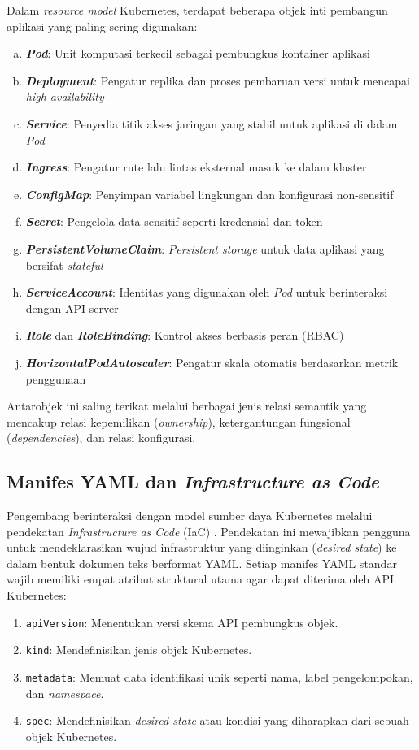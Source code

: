 Dalam \textit{resource model} Kubernetes, terdapat beberapa objek inti pembangun aplikasi yang paling sering digunakan:

\begin{enumerate}[a.]
    \item \textbf{\textit{Pod}}: Unit komputasi terkecil sebagai pembungkus kontainer aplikasi
    \item \textbf{\textit{Deployment}}: Pengatur replika dan proses pembaruan versi untuk mencapai \textit{high availability}
    \item \textbf{\textit{Service}}: Penyedia titik akses jaringan yang stabil untuk aplikasi di dalam \textit{Pod}
    \item \textbf{\textit{Ingress}}: Pengatur rute lalu lintas eksternal masuk ke dalam klaster
    \item \textbf{\textit{ConfigMap}}: Penyimpan variabel lingkungan dan konfigurasi non-sensitif
    \item \textbf{\textit{Secret}}: Pengelola data sensitif seperti kredensial dan token
    \item \textbf{\textit{PersistentVolumeClaim}}: \textit{Persistent storage} untuk data aplikasi yang bersifat \textit{stateful}
    \item \textbf{\textit{ServiceAccount}}: Identitas yang digunakan oleh \textit{Pod} untuk berinteraksi dengan API server
    \item \textbf{\textit{Role}} dan \textbf{\textit{RoleBinding}}: Kontrol akses berbasis peran (RBAC)
    \item \textbf{\textit{HorizontalPodAutoscaler}}: Pengatur skala otomatis berdasarkan metrik penggunaan
\end{enumerate}

Antarobjek ini saling terikat melalui berbagai jenis relasi semantik yang mencakup relasi kepemilikan (\textit{ownership}), ketergantungan fungsional (\textit{dependencies}), dan relasi konfigurasi.
\subsection{Manifes YAML dan \textit{Infrastructure as Code}}

Pengembang berinteraksi dengan model sumber daya Kubernetes melalui pendekatan \textit{Infrastructure as Code} (IaC) \parencite{k8s_docs_concepts}. Pendekatan ini mewajibkan pengguna untuk mendeklarasikan wujud infrastruktur yang diinginkan (\textit{desired state}) ke dalam bentuk dokumen teks berformat YAML. Setiap manifes YAML standar wajib memiliki empat atribut struktural utama agar dapat diterima oleh API Kubernetes:
\begin{enumerate}
    \item \texttt{apiVersion}: Menentukan versi skema API pembungkus objek.
    \item \texttt{kind}: Mendefinisikan jenis objek Kubernetes.
    \item \texttt{metadata}: Memuat data identifikasi unik seperti nama, label pengelompokan, dan \textit{namespace}.
    \item \texttt{spec}: Mendefinisikan \textit{desired state} atau kondisi yang diharapkan dari sebuah objek Kubernetes.
\end{enumerate}

